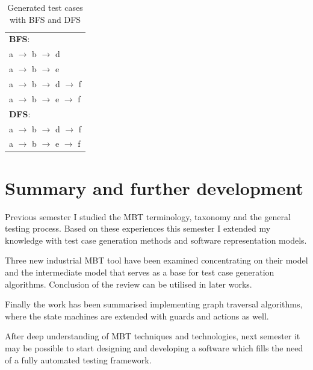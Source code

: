 \documentclass{article}
\begin{document}
\begin{table}[htb]
\begin{center}
\begin{tabular}{l}
	\textbf{BFS}: \\
	a $\rightarrow$ b $\rightarrow$ d \\
	a $\rightarrow$ b $\rightarrow$ e \\
	a $\rightarrow$ b $\rightarrow$ d $\rightarrow$ f \\
	a $\rightarrow$ b $\rightarrow$ e $\rightarrow$ f \\\hline
	\textbf{DFS}: \\
	a $\rightarrow$ b $\rightarrow$ d $\rightarrow$ f \\
	a $\rightarrow$ b $\rightarrow$ e $\rightarrow$ f
\end{tabular}
\end{center}
\caption{\label{tab:bfsdfsresults} Generated test cases with BFS and DFS}
\end{table}


\section{Summary and further development}
\label{sec:summary}

Previous semester I studied the MBT terminology, taxonomy and the general testing process. Based on these experiences this semester I extended my knowledge with test case generation methods and software representation models.

Three new industrial MBT tool have been examined concentrating on their model and the intermediate model that serves as a base for test case generation algorithms. Conclusion of the review can be utilised in later works.

Finally the work has been summarised implementing graph traversal algorithms, where the state machines are extended with guards and actions as well.

After deep understanding of MBT techniques and technologies, next semester it may be possible to start designing and developing a software which fills the need of a fully automated testing framework.


\clearpage
\nocite{*}


\end{document}

